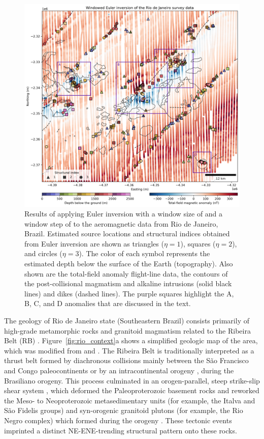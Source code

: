 \begin{figure}[tb!]
\centering
\includegraphics[width=1\linewidth]{figures/real-data-application.png}
\caption{
    Results of applying Euler inversion with a window size of \RioWindowSize{} and a window step of \RioWindowStep{} to the aeromagnetic data from Rio de Janeiro, Brazil.
    Estimated source locations and structural indices obtained from Euler inversion are shown as triangles ($\eta=1$), squares ($\eta=2$), and circles ($\eta=3$).
    The color of each symbol represents the estimated depth below the surface of the Earth (topography).
    Also shown are the total-field anomaly flight-line data, the contours of the post-collisional magmatism and alkaline intrusions (solid black lines) and dikes (dashed lines).
    The purple squares highlight the A, B, C, and D anomalies that are discussed in the text.
}
\label{fig:rio_results}
\end{figure}

The geology of Rio de Janeiro state (Southeastern Brazil) consists primarily of
high-grade metamorphic rocks and granitoid magmatism related to the Ribeira
Belt (RB) \citep{Heilbron2020}.
Figure~\ref{fig:rio_context}a shows a simplified geologic map of the area, which was modified from \citet{Heilbron2016} and \citet{Dantas2017}.
The Ribeira Belt is traditionally interpreted as a thrust
belt formed by diachronous collisions mainly between the São Francisco and
Congo paleocontinents \citep{Heilbron2008, Trouw2000} or by an intracontinental
orogeny \citep[\textit{e.g.}][]{Meira2015, Meira2019}, during the Brasiliano
orogeny. This process culminated in an orogen-parallel, steep strike-slip shear
system \citep{EgydioSilva2005}, which deformed the Paleoproterozoic basement
rocks and reworked the Meso- to Neoproterozoic metasedimentary units (for example, the
Italva and São Fidelis groups) and syn-orogenic granitoid plutons (for example, the Rio
Negro complex) which formed during the orogeny \citep{Heilbron2003, Heilbron2020}.
These tectonic events imprinted a distinct NE-ENE-trending structural pattern
onto these rocks.

